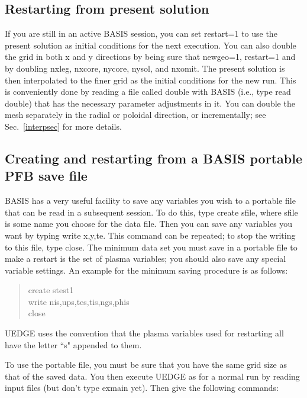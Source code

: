 \documentclass [12pt]{article}
\begin{document}
\subsection{Restarting from present solution}

If you are still in an active {\sf BASIS} session, you can set restart=1 to
use the present solution as initial conditions for the next execution.  You
can also double the grid in both x and y directions by being sure that
newgeo=1, restart=1 and by doubling {\sf nxleg, nxcore, nycore, nysol,} and
{\sf nxomit}.  The present solution is then interpolated to the finer grid as
the initial conditions for the new run.  This is conveniently done by reading
a file called {\sf double} with {\sf BASIS} (i.e., type {\sf read double})
that has the necessary parameter adjustments in it. You can double the mesh
separately in the radial or poloidal direction, or incrementally; see
Sec.~\ref{interpsec} for more details.

\subsection{Creating and restarting from a {\sf BASIS} portable PFB save file}

{\sf BASIS} has a very useful facility to save any variables you wish to a
portable file that can be read in a subsequent session.  To do this, type {\sf
  create sfile}, where sfile is some name you choose for the data file.  Then
you can save any variables you want by typing {\sf write x,y,te}.  This
command can be repeated; to stop the writing to this file, type {\sf close}.
The minimum data set you must save in a portable file to make a restart is the
set of plasma variables; you should also save any special variable settings.
An example for the minimum saving procedure is as follows:

\begin{verse} \sf
create stest1 \\
write nis,ups,tes,tis,ngs,phis \\
close
\end{verse}
%
{\sf UEDGE} uses the convention that the plasma variables used for restarting
all have the letter ``s" appended to them.

To use the portable file, you must be sure that you have the same grid size
as that of the saved data.  You then execute {\sf UEDGE} as for a normal run by
reading input files (but don't type {\sf exmain} yet).  Then give the following
commands:
\end{document}
